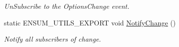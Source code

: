 \begin{DoxyCompactItemize}
\begin{DoxyCompactList}\small\item\em Un\+Subscribe to the Options\+Change event. \end{DoxyCompactList}\item 
static E\+N\+S\+U\+M\+\_\+\+U\+T\+I\+L\+S\+\_\+\+E\+X\+P\+O\+RT void \hyperlink{class_ensum_1_1_utils_1_1_options_aad51d23ce53015deecdd79180f1b92f0}{Notify\+Change} ()\hypertarget{class_ensum_1_1_utils_1_1_options_aad51d23ce53015deecdd79180f1b92f0}{}\label{class_ensum_1_1_utils_1_1_options_aad51d23ce53015deecdd79180f1b92f0}

\begin{DoxyCompactList}\small\item\em Notify all subscribers of change. \end{DoxyCompactList}\end{DoxyCompactItemize}
